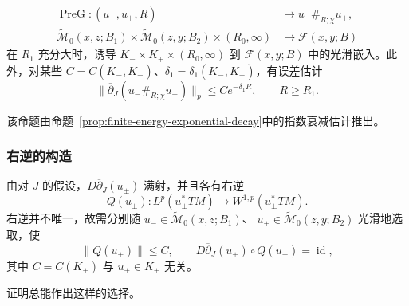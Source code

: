 \begin{proposition}
\label{prop:pregluing-error-estimate}
\termPreGluingMap{}
\[
\begin{aligned}
 \operatorname{PreG}:(u_-,u_+,R)&\longmapsto u_-\#_{R;\chi}u_+,\\
 \widetilde{\mathcal M}_0(x,z;B_1)
 \times\widetilde{\mathcal M}_0(z,y;B_2)\times(R_0,\infty)
 &\longrightarrow\mathcal F(x,y;B)
\end{aligned}
\]
在 $R_1$ 充分大时，诱导 $K_-\times K_+\times(R_0,\infty)$ 到
$\mathcal F(x,y;B)$ 中的光滑嵌入。此外，对某些
$C=C(K_-,K_+)$、$\delta_1=\delta_1(K_-,K_+)$，有误差估计
\begin{equation}
 \|\overline\partial_J(u_-\#_{R;\chi}u_+)\|_p
 \leq Ce^{-\delta_1R},
 \qquad R\geq R_1.
 \label{eq:pregluing-error-exponential}
\end{equation}
\end{proposition}

该命题由命题~\ref{prop:finite-energy-exponential-decay}中的指数衰减估计推出。

\subsubsection*{右逆的构造}
由对 $J$ 的假设，$D\overline\partial_J(u_\pm)$ 满射，并且各有右逆
\[
 Q(u_\pm):L^p(u_\pm^*TM)\longrightarrow W^{1,p}(u_\pm^*TM).
\]
右逆并不唯一，故需分别随
$u_-\in\widetilde{\mathcal M}_0(x,z;B_1)$、
$u_+\in\widetilde{\mathcal M}_0(z,y;B_2)$ 光滑地选取，使
\begin{equation}
 \|Q(u_\pm)\|\leq C,
 \qquad
 D\overline\partial_J(u_\pm)\circ Q(u_\pm)=\operatorname{id},
 \label{eq:smooth-uniform-right-inverses}
\end{equation}
其中 $C=C(K_\pm)$ 与 $u_\pm\in K_\pm$ 无关。

\begin{exercise}
\label{ex:smooth-choice-right-inverse}
证明总能作出这样的选择。
\end{exercise}

